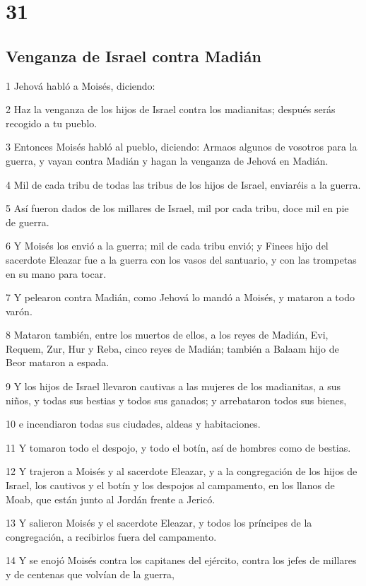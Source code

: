 \chapter{31}

\section*{Venganza de Israel contra Madián}

\par 1 Jehová habló a Moisés, diciendo:
\par 2 Haz la venganza de los hijos de Israel contra los madianitas; después serás recogido a tu pueblo.
\par 3 Entonces Moisés habló al pueblo, diciendo: Armaos algunos de vosotros para la guerra, y vayan contra Madián y hagan la venganza de Jehová en Madián.
\par 4 Mil de cada tribu de todas las tribus de los hijos de Israel, enviaréis a la guerra.
\par 5 Así fueron dados de los millares de Israel, mil por cada tribu, doce mil en pie de guerra.
\par 6 Y Moisés los envió a la guerra; mil de cada tribu envió; y Finees hijo del sacerdote Eleazar fue a la guerra con los vasos del santuario, y con las trompetas en su mano para tocar.
\par 7 Y pelearon contra Madián, como Jehová lo mandó a Moisés, y mataron a todo varón.
\par 8 Mataron también, entre los muertos de ellos, a los reyes de Madián, Evi, Requem, Zur, Hur y Reba, cinco reyes de Madián; también a Balaam hijo de Beor mataron a espada.
\par 9 Y los hijos de Israel llevaron cautivas a las mujeres de los madianitas, a sus niños, y todas sus bestias y todos sus ganados; y arrebataron todos sus bienes,
\par 10 e incendiaron todas sus ciudades, aldeas y habitaciones.
\par 11 Y tomaron todo el despojo, y todo el botín, así de hombres como de bestias.
\par 12 Y trajeron a Moisés y al sacerdote Eleazar, y a la congregación de los hijos de Israel, los cautivos y el botín y los despojos al campamento, en los llanos de Moab, que están junto al Jordán frente a Jericó.
\par 13 Y salieron Moisés y el sacerdote Eleazar, y todos los príncipes de la congregación, a recibirlos fuera del campamento.
\par 14 Y se enojó Moisés contra los capitanes del ejército, contra los jefes de millares y de centenas que volvían de la guerra,

